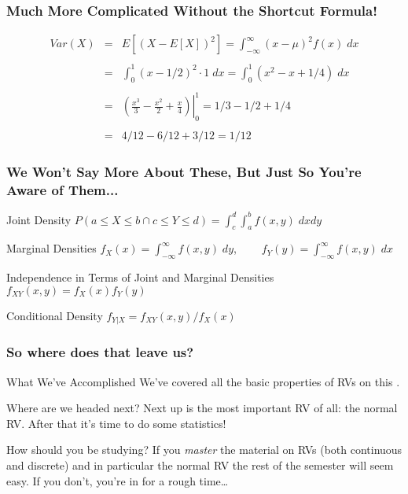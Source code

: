 \begin{frame}
\frametitle{Much More Complicated Without the Shortcut Formula!}
\begin{eqnarray*}
 Var(X) &=& E\left[ \left( X - E[X] \right)^2\right] = \int_{-\infty}^{\infty} (x - \mu)^2 f(x) \; dx\\ \\
 	&=&\int_{0}^{1} (x -1/2)^2 \cdot 1 \; dx = \int_{0}^{1} (x^2  - x + 1/4) \; dx \\ \\
 		&=& \left. \left(\frac{x^3}{3} - \frac{x^2}{2} + \frac{x}{4}  \right)\right|_0^1 = 1/3 - 1/2 + 1/4\\ \\ 
 			&=& 4/12 - 6/12 + 3/12 = 1/12
\end{eqnarray*}
\end{frame}

\begin{frame}
\frametitle{We Won't Say More About These, But Just So You're Aware of Them...}

\begin{block}{Joint Density}
$ \displaystyle P(a\leq X \leq b \cap c\leq Y \leq d) = \int_c^d \int_a^b f(x,y) \; dxdy$
\end{block}
\begin{block}{Marginal Densities}
$f_X(x) = \int_{-\infty}^\infty f(x,y)\; dy$, $\;\;\;\;\;\;\; f_Y(y) = \int_{-\infty}^\infty f(x,y)\; dx$
\end{block}
\begin{block}{Independence in Terms of Joint and Marginal Densities}
$f_{XY}(x,y) = f_X(x)f_Y(y)$
\end{block}
\begin{block}{Conditional Density}
$f_{Y|X} = f_{XY}(x,y)/f_X(x)$
\end{block}

\end{frame}

\begin{frame}
  \frametitle{So where does that leave us?}

  \begin{block}{What We've Accomplished}
    We've covered all the basic properties of RVs on this \href{http://ditraglia.com/Econ103Public/RandomVariablesHandout.pdf}{\textcolor{blue}{}}.
  \end{block}

  \begin{block}{Where are we headed next?}
   Next up is the most important RV of all: the normal RV. 
   After that it's time to do some statistics!
  \end{block}

  \begin{alertblock}{How should you be studying?}
    If you \emph{master} the material on RVs (both continuous and discrete) and in particular the normal RV the rest of the semester will seem easy. 
    If you don't, you're in for a rough time\dots
  \end{alertblock}


\end{frame}
